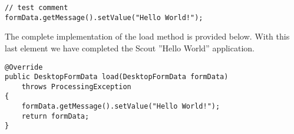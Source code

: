 \begin{lstlisting}[backgroundcolor=\color{white}]
// test comment
formData.getMessage().setValue("Hello World!");
\end{lstlisting}

The complete implementation of the load method is provided below.
With this last element we have completed the Scout ''Hello World'' application.

\begin{lstlisting}
@Override
public DesktopFormData load(DesktopFormData formData) 
    throws ProcessingException 
{
    formData.getMessage().setValue("Hello World!"); 
    return formData;
}
\end{lstlisting}

